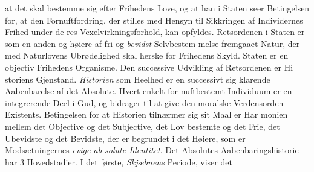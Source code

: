 \documentclass[12pt,a4paper]{book}
\begin{document}
at det skal bestemme sig efter Frihedens Love, og at han i
Staten seer Betingelsen for, at den Fornuftfordring, der stilles
med Hensyn til Sikkringen af Individernes Frihed under de\-%
res Vexelvirkningsforhold, kan opfyldes. Retsordenen i Staten
er som en anden og høiere af fri og \emph{bevidst} Selvbestem\-%
melse fremgaaet Natur, der med Naturlovens Ubrødelighed skal
herske for Frihedens Skyld. Staten er en objectiv Frihedens
Organisme. Den successive Udvikling af Retsordenen er Hi\-%
storiens Gjenstand. \emph{Historien} som Heelhed er en successivt
sig klarende Aabenbarelse af det Absolute. Hvert enkelt for\-%
nuftbestemt Individuum er en integrerende Deel i Gud, og
bidrager til at give den moralske Verdensorden Existents.
Betingelsen for at Historien tilnærmer sig sit Maal er Har\-%
monien mellem det Objective og det Subjective, det Lov\-%
bestemte og det Frie, det Ubevidste og det Bevidste, der er
begrundet i det Høiere, som er Modsætningernes \emph{evige ab\-%
solute Identitet}. Det Absolutes Aabenbaringshistorie har
3 Hovedstadier. I det første, \emph{Skjæbnens} Periode, viser det
\end{document}
